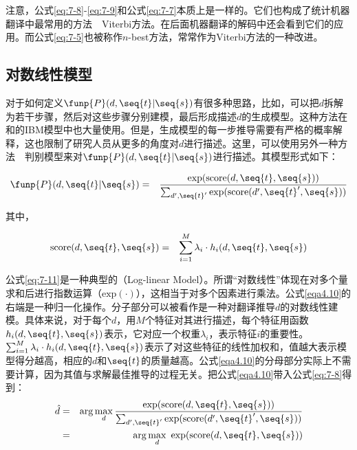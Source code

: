 \parinterval 注意，公式\eqref{eq:7-8}-\eqref{eq:7-9}和公式\eqref{eq:7-7}本质上是一样的。它们也构成了统计机器翻译中最常用的方法\ \dash \ Viterbi方法。在后面机器翻译的解码中还会看到它们的应用。而公式\eqref{eq:7-5}也被称作$n$-best方法，常常作为Viterbi方法的一种改进。


\subsection{对数线性模型}

\parinterval 对于如何定义$\funp{P}(d,\seq{t}|\seq{s})$有很多种思路，比如，可以把$d$拆解为若干步骤，然后对这些步骤分别建模，最后形成描述$d$的生成模型。这种方法在{\chapterfive}和{\chaptersix}的IBM模型中也大量使用。但是，生成模型的每一步推导需要有严格的概率解释，这也限制了研究人员从更多的角度对$d$进行描述。这里，可以使用另外一种方法\ \dash \ 判别模型来对$\funp{P}(d,\seq{t}|\seq{s})$进行描述。其模型形式如下：

\begin{eqnarray}
\funp{P}(d,\seq{t}|\seq{s}) &=& \frac{\textrm{exp}(\textrm{score}(d,\seq{t},\seq{s}))}{\sum_{d',\seq{t}'} \textrm{exp}(\textrm{score}(d',\seq{t}',\seq{s}))} \label{eqa4.10}
\end{eqnarray}

\noindent 其中，

\begin{eqnarray}
\textrm{score}(d,\seq{t},\seq{s}) &=& \sum_{i=1}^{M} \lambda_i \cdot h_i (d,\seq{t},\seq{s})
\label{eq:7-11}
\end{eqnarray}

\parinterval 公式\eqref{eq:7-11}是一种典型的{\small{}}（Log-linear Model）。所谓“对数线性”体现在对多个量求和后进行指数运算（$\textrm{exp}(\cdot)$），这相当于对多个因素进行乘法。公式\eqref{eqa4.10}的右端是一种归一化操作。分子部分可以被看作是一种对翻译推导$d$的对数线性建模。具体来说，对于每个$d$，用$M$个特征对其进行描述，每个特征用函数$h_i (d,\seq{t},\seq{s})$表示，它对应一个权重$\lambda_i$，表示特征$i$的重要性。$\sum_{i=1}^{M} \lambda_i \cdot h_i (d,\seq{t},\seq{s})$表示了对这些特征的线性加权和，值越大表示模型得分越高，相应的$d$和$\seq{t}$的质量越高。公式\eqref{eqa4.10}的分母部分实际上不需要计算，因为其值与求解最佳推导的过程无关。把公式\eqref{eqa4.10}带入公式\eqref{eq:7-8}得到：
\begin{eqnarray}
\hat{d} &=& \arg\max_{d} \frac{\textrm{exp}(\textrm{score}(d,\seq{t},\seq{s}))}{\sum_{d',\seq{t}'} \textrm{exp}(\textrm{score}(d',\seq{t}',\seq{s}))} \nonumber \\
&=& \arg\max_{d}\ \textrm{exp}(\textrm{score}(d,\seq{t},\seq{s}))
\label{eq:7-12}
\end{eqnarray}

